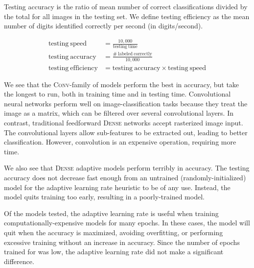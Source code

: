 \documentclass{article}
\begin{document}
Testing accuracy is the ratio of mean number of correct classifications divided by the total
for all images in the testing set.
We define testing efficiency as the mean number of digits identified correctly per second (in digits/second).

\begin{align}
  \mathrm{testing~speed} &= \frac{10,000}{\mathrm{testing~time}} \\
  \mathrm{testing~accuracy} &= \frac{\mathrm{\#~labeled~correctly}}{10,000} \\
  \mathrm{testing~efficiency} &= \mathrm{testing~accuracy} \times \mathrm{testing~speed}
\end{align}

We see that the \textsc{Conv}-family of models perform the best in accuracy,
but take the longest to run, both in training time and in testing time.
Convolutional neural networks perform well on image-classification tasks
because they treat the image as a matrix, which can be filtered over several convolutional layers.
In contrast, traditional feedforward \textsc{Dense} networks accept rasterized image input.
The convolutional layers allow sub-features to be extracted out, leading to better classification.
However, convolution is an expensive operation, requiring more time.

We also see that \textsc{Dense} adaptive models perform terribly in accuracy.
The testing accuracy does not decrease fast enough from an untrained (randomly-initialized) model
for the adaptive learning rate heuristic to be of any use.
Instead, the model quits training too early, resulting in a poorly-trained model.

Of the models tested, the adaptive learning rate is useful when training computationally-expensive
models for many epochs.
In these cases, the model will quit when the accuracy is maximized,
avoiding overfitting, or performing excessive training without an increase in accuracy.
Since the number of epochs trained for was low, the adaptive learning rate
did not make a significant difference.
\end{document}
